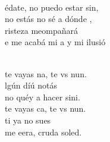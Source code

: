 \begin{cancion}
\jump\\
	édate, no puedo estar sin,\\
	no estás no sé a dónde ,\\
	risteza meompañará\\
	e me acabá mi a y mi ilusió\\\jump\\
	\begin{chorus}%
	 te vayas na, te vs nun.\\
	lgún díú notás\\
	no  quéy a hacer sini. \\
	 te vayas ca, te vs nun.\\
	ti ya no  sues\\
	me eera, cruda soled.\\
	\end{chorus}%
	\jump\\
\end{cancion}%
